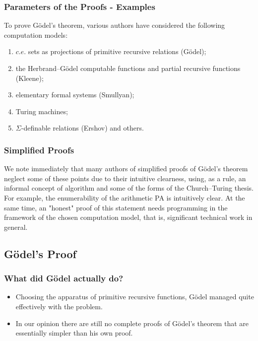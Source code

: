 \documentclass[aspectratio=169]{beamer}
\begin{document}
\begin{frame}
	\frametitle{Parameters of the Proofs - Examples}
	To prove Gödel’s theorem, various authors have considered the following computation models: \\
	\begin{enumerate}
		\item $c.e.$ sets as projections of primitive recursive relations (Gödel);
		\item the Herbrand–Gödel computable functions and partial recursive functions (Kleene);
		\item elementary formal systems (Smullyan);
		\item Turing machines;
		\item $\Sigma$-definable relations (Ershov) and others.
	\end{enumerate}
	\begin{flushright}
		\cite{bekl}
	\end{flushright}
\end{frame}

\begin{frame}
	\frametitle{Simplified Proofs}
	We note immediately that many authors of simplified proofs of Gödel's theorem neglect some of these points due to their intuitive clearness, using, as a rule, an informal concept of algorithm and some of the forms of the Church–Turing thesis. For example, the enumerability of the arithmetic PA is intuitively clear. At the same time, an "honest" proof of this statement needs programming in the framework of the chosen computation model, that is, significant technical work in general.
	\begin{flushright}
		\cite{bekl}
	\end{flushright}
\end{frame}

\subsection{Gödel's Proof}
\begin{frame}
	\frametitle{What did Gödel actually do?}
	\begin{itemize}
		\item Choosing the apparatus of primitive recursive functions, Gödel managed quite effectively with the problem.
		\item In our opinion there are still no complete proofs of Gödel’s theorem that are essentially simpler than his own proof.
	\end{itemize}
	\begin{flushright}
		\cite{bekl}
	\end{flushright}
\end{frame}
\end{document}
